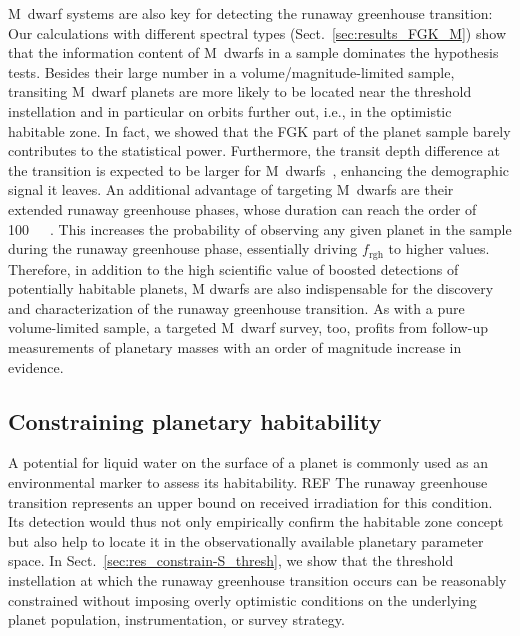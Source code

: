 \documentclass[modern]{aastex631}
\begin{document}
M~dwarf systems are also key for detecting the runaway greenhouse transition:
Our calculations with different spectral types (Sect.~\ref{sec:results_FGK_M}) show that the information content of M~dwarfs in a sample dominates the hypothesis tests.
Besides their large number in a volume/magnitude-limited sample, transiting M~dwarf planets are more likely to be located near the threshold instellation and in particular on orbits further out, i.e., in the optimistic habitable zone.
In fact, we showed that the FGK part of the planet sample barely contributes to the statistical power.
Furthermore, the transit depth difference at the transition is expected to be larger for M~dwarfs~\citep[$\sim \SI{100}{\ppm}$ for early, $\sim \SI{1000}{\ppm}$ for late M~stars][]{Turbet2019}, enhancing the demographic signal it leaves.
An additional advantage of targeting M~dwarfs are their extended runaway greenhouse phases, whose duration can reach the order of \SI{100}{\mega\year}~\citep{Luger2015}.
This increases the probability of observing any given planet in the sample during the runaway greenhouse phase, essentially driving $f_\mathrm{rgh}$ to higher values.
Therefore, in addition to the high scientific value of boosted detections of potentially habitable planets, M dwarfs are also indispensable for the discovery and characterization of the runaway greenhouse transition.
As with a pure volume-limited sample, a targeted M~dwarf survey, too, profits from follow-up measurements of planetary masses with an order of magnitude increase in evidence.


\subsection{Constraining planetary habitability}\label{sec:habitability}
A potential for liquid water on the surface of a planet is commonly used as an environmental marker to assess its habitability. REF
The runaway greenhouse transition represents an upper bound on received irradiation for this condition.
Its detection would thus not only empirically confirm the habitable zone concept but also help to locate it in the observationally available planetary parameter space.
In Sect.~\ref{sec:res_constrain-S_thresh}, we show that the threshold instellation at which the runaway greenhouse transition occurs can be reasonably constrained without imposing overly optimistic conditions on the underlying planet population, instrumentation, or survey strategy.
\end{document}
